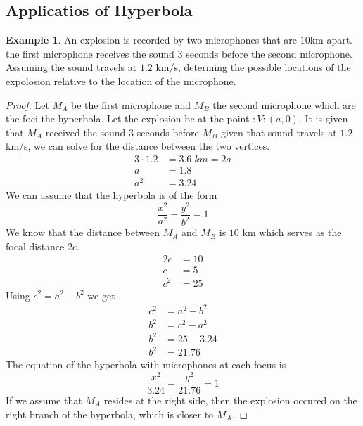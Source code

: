 \documentclass[a4paper]{article}
\theoremstyle{definition}
\newtheorem*{eg}{Example}
\begin{document}
\newpage
\subsection{Applicatios of Hyperbola}
\begin{eg}
      An explosion is recorded by two microphones that are $10$km apart. 
      the first microphone receives the sound $3$ seconds before the second 
      microphone. Assuming the sound travels at $1.2$ km/s, determing the
     possible locations of the expolosion relative to the location of the 
      microphone.
     \begin{proof}
           Let $M_A$ be the first microphone and $M_B$ the second microphone
           which are the foci the hyperbola. Let the explosion be at the point
           $:V:(a,0)$. It is given that $M_A$ received the sound $3$ seconds
           before $M_B$ given that sound travels at $1.2$ km/s, we can solve for
           the distance between the two vertices.
          \begin{align*}
               3 \cdot 1.2 &= 3.6\;km = 2a \\[1.25ex]
               a &= 1.8 \\[1.25ex]
               a^2 &= 3.24
          \end{align*}
          We can assume that the hyperbola is of the form 
          \begin{equation*}
               \dfrac{x^2}{a^2}-\dfrac{y^2}{b^2}=1
          \end{equation*}
          We know that the distance between $M_A$ and $M_B$ is $10$ km which
          serves as  the focal distance $2c$.
          \begin{align*}
               2c &= 10 \\[1.25ex]
               c &= 5 \\[1.25ex]
               c^2 &= 25
          \end{align*}
          Using $c^2=a^2+b^2$ we get 
          \begin{align*}
               c^2&=a^2+b^2 \\[1.25ex]
               b^2 &= c^2-a^2 \\[1.25ex]
               b^2 &= 25-3.24 \\[1.25ex]
               b^2 &= 21.76
          \end{align*}
          The equation of the hyperbola with microphones at each focus is 
          \begin{equation*}
               \dfrac{x^2}{3.24}-\dfrac{y^2}{21.76}=1
          \end{equation*}
          If we assume that $M_A$ resides at the right side, then the explosion
          occured on the right branch of the hyperbola, which is closer to
          $M_A$.
     \end{proof}
\end{eg}
\end{document}
